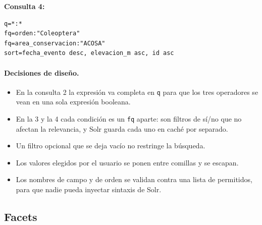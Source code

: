 \documentclass[11pt,a4paper]{article}
\newcommand{\cod}[1]{\texttt{#1}}
\newenvironment{bloque}[1]%
  {\par\medskip\noindent\begin{minipage}{\linewidth}#1}%
  {\end{minipage}\par\medskip}
\begin{document}
\begin{bloque}{\textbf{Consulta 4:}}
\begin{lstlisting}
q=*:*
fq=orden:"Coleoptera"
fq=area_conservacion:"ACOSA"
sort=fecha_evento desc, elevacion_m asc, id asc
\end{lstlisting}
\end{bloque}

\paragraph{Decisiones de diseño.}
\begin{itemize}
  \item En la consulta 2 la expresión va completa en \cod{q} para que los tres operadores
        se vean en una sola expresión booleana.
  \item En la 3 y la 4 cada condición es un \cod{fq} aparte: son filtros de sí/no que no
        afectan la relevancia, y Solr guarda cada uno en caché por separado.
  \item Un filtro opcional que se deja vacío no restringe la búsqueda.
  \item Los valores elegidos por el usuario se ponen entre comillas y se escapan.
  \item Los nombres de campo y de orden se validan contra una lista de permitidos, para
        que nadie pueda inyectar sintaxis de Solr.
\end{itemize}

\subsection{Facets}
\end{document}
